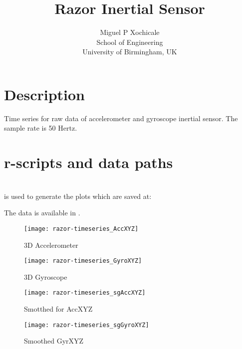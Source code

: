 \documentclass[a4paper,12pt]{article}
\title{Razor Inertial Sensor}
\author{Miguel P Xochicale \\
School of Engineering\\
University of Birmingham, UK}
\begin{document}
\maketitle



\section{Description}
Time series for raw data of accelerometer and gyroscope inertial sensor.
The sample rate is 50 Hertz. 


\section{r-scripts and data paths}
 \\
is used to generate the plots which are saved at: \\

The data is available in \cite{mxochicale2018}.









\begin{figure}
\centering
\texttt{[image: razor-timeseries\_AccXYZ]}
\caption{3D Accelerometer}
\end{figure}

\begin{figure}
\centering
\texttt{[image: razor-timeseries\_GyroXYZ]}
\caption{3D Gyroscope}
\end{figure}





\begin{figure}
\centering
\texttt{[image: razor-timeseries\_sgAccXYZ]}
\caption{Smotthed for AccXYZ}
\end{figure}

\begin{figure}
\centering
\texttt{[image: razor-timeseries\_sgGyroXYZ]}
\caption{Smoothed GyrXYZ}
\end{figure}
\end{document}
